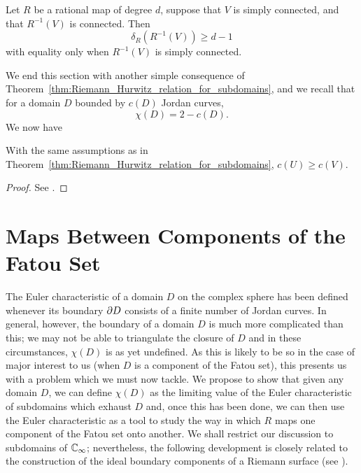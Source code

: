 \begin{corollary}
    Let $R$ be a rational map of degree $d$, suppose that $V$ is simply
    connected, and that $R^{-1}(V)$ is connected. Then
    \begin{equation*}
        \delta_R(R^{-1}(V)) \geq d-1
    \end{equation*}
    with equality only when $R^{-1}(V)$ is simply connected.
\end{corollary}

We end this section with another simple consequence of
Theorem~\ref{thm:Riemann_Hurwitz_relation_for_subdomains}, and we recall that
for a domain $D$ bounded by $c(D)$ Jordan curves,
\begin{equation}
    \label{eq:Eulers_characteristic_formula_for_bounded_domains_via_connectivity}
    \chi(D) = 2 - c(D).
\end{equation}
We now have

\begin{proposition}[$c(U) \geq c(V)$]
    With the same assumptions as in
    Theorem~\ref{thm:Riemann_Hurwitz_relation_for_subdomains}, $c(U) \geq c(V)$.
\end{proposition}
\begin{proof}
    See \cite[89]{Beardon1991}.
\end{proof}

\section{Maps Between Components of the Fatou Set}
\label{sec:maps_between_components_of_the_Fatou_set}

The Euler characteristic of a domain $D$ on the complex sphere has been defined
whenever its boundary $\partial {D}$ consists of a finite number of Jordan
curves. In general, however, the boundary of a domain $D$ is much more
complicated than this; we may not be able to triangulate the closure of $D$ and
in these circumstances, $\chi(D)$ is as yet undefined. As this is likely to be
so in the case of major interest to us (when $D$ is a component of the Fatou
set), this presents us with a problem which we must now tackle. We propose to
show that given any domain $D$, we can define $\chi(D)$ as the limiting value of
the Euler characteristic of subdomains which exhaust $D$ and, once this has been
done, we can then use the Euler characteristic as a tool to study the way in
which $R$ maps one component of the Fatou set onto another. We shall restrict
our discussion to subdomains of $\mathbb{C}_\infty$; nevertheless, the following development
is closely related to the construction of the ideal boundary components of a
Riemann surface (see \cite[25--26, 81--87]{Ahlfors1960}).

